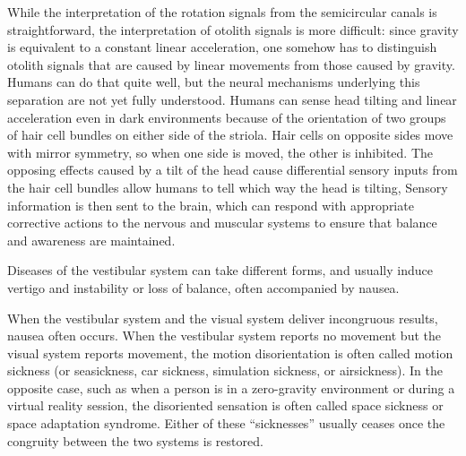While the interpretation of the rotation signals from the semicircular canals is straightforward, the interpretation of otolith signals is more difficult: since gravity is equivalent to a constant linear acceleration, one somehow has to distinguish otolith signals that are caused by linear movements from those caused by gravity. Humans can do that quite well, but the neural mechanisms underlying this separation are not yet fully understood. Humans can sense head tilting and linear acceleration even in dark environments because of the orientation of two groups of hair cell bundles on either side of the striola. Hair cells on opposite sides move with mirror symmetry, so when one side is moved, the other is inhibited. The opposing effects caused by a tilt of the head cause differential sensory inputs from the hair cell bundles allow humans to tell which way the head is tilting, Sensory information is then sent to the brain, which can respond with appropriate corrective actions to the nervous and muscular systems to ensure that balance and awareness are maintained.

Diseases of the vestibular system can take different forms, and usually induce vertigo and instability or loss of balance, often accompanied by nausea.

When the vestibular system and the visual system deliver incongruous results, nausea often occurs. When the vestibular system reports no movement but the visual system reports movement, the motion disorientation is often called motion sickness (or seasickness, car sickness, simulation sickness, or airsickness). In the opposite case, such as when a person is in a zero-gravity environment or during a virtual reality session, the disoriented sensation is often called space sickness or space adaptation syndrome. Either of these ``sicknesses'' usually ceases once the congruity between the two systems is restored.

